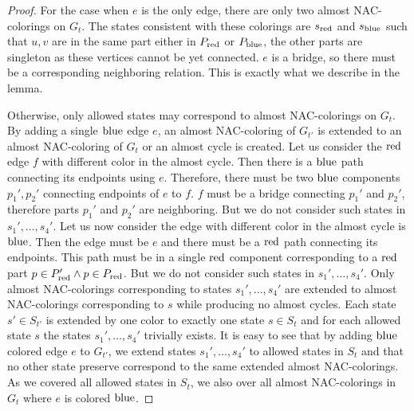 \begin{proof}
	For the case when \( e \) is the only edge,
	there are only two almost NAC-colorings on \( G_t \).
	The states consistent with these colorings are \( s_{\text{red}} \) and \( s_{\text{blue}} \)
	such that \( u, v \) are in the same part either in \( P_{\text{red}} \) or \( P_{\text{blue}} \),
	the other parts are singleton as these vertices cannot be yet connected.
	\( e \) is a bridge, so there must be a corresponding neighboring relation.
	This is exactly what we describe in the lemma.

	Otherwise, only allowed states may correspond to almost NAC-colorings on \( G_t \).
	By adding a single \( \text{blue} \) edge \( e \),
	an almost NAC-coloring of \( G_{t'} \)
	is extended to an almost NAC-coloring of \( G_t \)
	or an almost cycle is created.
	Let us consider the \( \text{red} \) edge \( f \) with different color in the almost cycle.
	Then there is a \( \text{blue} \) path connecting its endpoints using \( e \).
	Therefore, there must be two \( \text{blue} \) components \( p_1', p_2' \)
	connecting endpoints of \( e \) to \( f \).
	\( f \) must be a bridge connecting \( p_1' \) and \( p_2' \),
	therefore parts \( p_1' \) and \( p_2' \) are neighboring.
	But we do not consider such states in \( s_1', \dots, s_4' \).
	Let us now consider the edge with different color in the almost cycle is \( \text{blue} \).
	Then the edge must be \( e \) and there must be a \( \text{red} \) path connecting its endpoints.
	This path must be in a single \( \text{red} \) component corresponding
	to a \( \text{red} \) part \( p \in P_{\text{red}}' \land p \in P_{\text{red}} \).
	But we do not consider such states in \( s_1', \dots, s_4' \).
	Only almost NAC-colorings
	corresponding to states \( s_1', \dots, s_4' \)
	are extended to almost NAC-colorings corresponding to \( s \)
	while producing no almost cycles.
	Each state \( s' \in S_{t'} \) is extended by one color
	to exactly one state \( s \in S_t \) and for each allowed state \( s \)
	the states \( s_1', \dots, s_4' \) trivially exists.
	It is easy to see that by adding \( \text{blue} \) colored edge \( e \) to \( G_{t'} \),
	we extend states \( s_1', \dots, s_4' \) to allowed states in \( S_{t} \)
	and that no other state preserve correspond to the same extended almost NAC-colorings.
	As we covered all allowed states in \( S_t \),
	we also over all almost NAC-colorings in \( G_t \) where \( e \) is colored \( \text{blue} \).
\end{proof}

